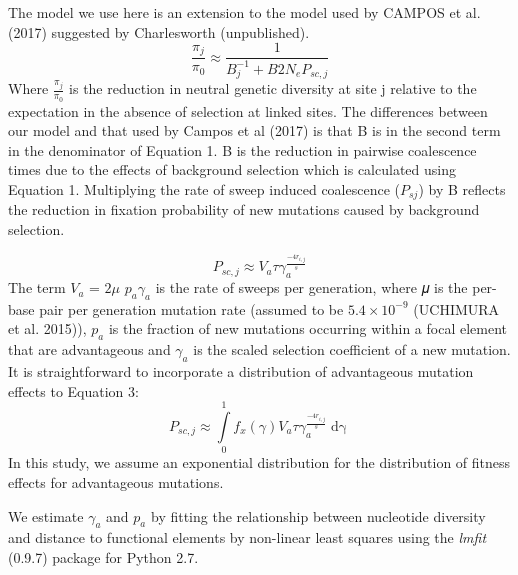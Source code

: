 \documentclass{article}
\begin{document}
The model we use here is an extension to the model used by CAMPOS et al. (2017) suggested by Charlesworth (unpublished). 
\begin{equation}
\frac{\pi_{j}}{\pi_{0}} \approx  \frac{1}{B_{j}^{-1}  + B2N_eP_{sc,j}}
\end{equation}
	Where \(\frac{\pi_{j}}{\pi_{0}}\) is the reduction in neutral genetic diversity at site j relative to the expectation in the absence of selection at linked sites. The differences between our model and that used by Campos et al (2017) is that B is in the second term in the denominator of Equation 1. B is the reduction in pairwise coalescence times due to the effects of background selection which is calculated using Equation 1. Multiplying the rate of sweep induced coalescence ($P_{sj}$) by B reflects the reduction in fixation probability of new mutations caused by background selection. 

\begin{equation}
P_{sc,j} \approx V_a \tau\gamma_a^{\frac{-4r_{i,j}}{s}} 
\end{equation}
The term $V_{a}$ = $2\mu$ $p_{a}\gamma_{a}$ is the rate of sweeps per generation, where 𝜇 is the per-base pair per generation mutation rate (assumed to be $5.4 \times 10^{-9}$ (UCHIMURA et al. 2015)), $p_a$ is the fraction of new mutations occurring within a focal element that are advantageous and $\gamma_a$  is the scaled selection coefficient of a new mutation. It is straightforward to incorporate a distribution of advantageous mutation effects to Equation 3:
		\begin{equation}
P_{sc,j} \approx \int \limits_{0}^{1} f_x(\gamma)   V_a \tau\gamma_a^{\frac{-4r_{i,j}}{s}} \mathop{d\gamma}
\end{equation}	
In this study, we assume an exponential distribution for the distribution of fitness effects for advantageous mutations. 

	We estimate $\gamma_a$ and $p_a$ by fitting the relationship between nucleotide diversity and distance to functional elements by non-linear least squares using the \emph{lmfit} (0.9.7) package for Python 2.7.
 
\end{document}
